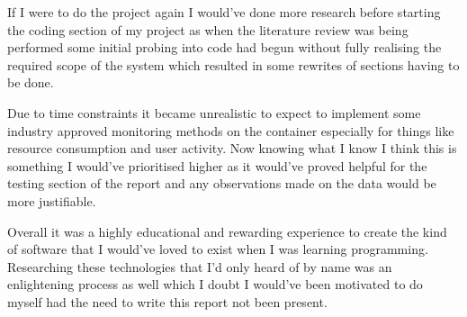 \documentclass[12pt, a4paper]{extreport}
\begin{document}
If I were to do the project again I would've done more research before starting the coding section of my project as when the literature review was being performed some initial probing into code had begun without fully realising the required scope of the system which resulted in some rewrites of sections having to be done.

Due to time constraints it became unrealistic to expect to implement some industry approved monitoring methods on the container especially for things like resource consumption and user activity. Now knowing what I know I think this is something I would've prioritised higher as it would've proved helpful for the testing section of the report and any observations made on the data would be more justifiable.

Overall it was a highly educational and rewarding experience to create the kind of software that I would've loved to exist when I was learning programming. Researching these technologies that I'd only heard of by name was an enlightening process as well which I doubt I would've been motivated to do myself had the need to write this report not been present.

\printbibliography

\pagebreak


% 
\end{document}
